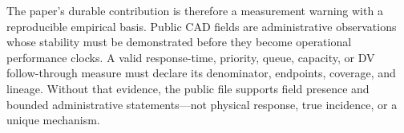 \documentclass[11pt]{article}
\begin{document}
The paper's durable contribution is therefore a measurement warning with a reproducible empirical basis. Public CAD fields are administrative observations whose stability must be demonstrated before they become operational performance clocks. A valid response-time, priority, queue, capacity, or DV follow-through measure must declare its denominator, endpoints, coverage, and lineage. Without that evidence, the public file supports field presence and bounded administrative statements---not physical response, true incidence, or a unique mechanism.



\end{document}
